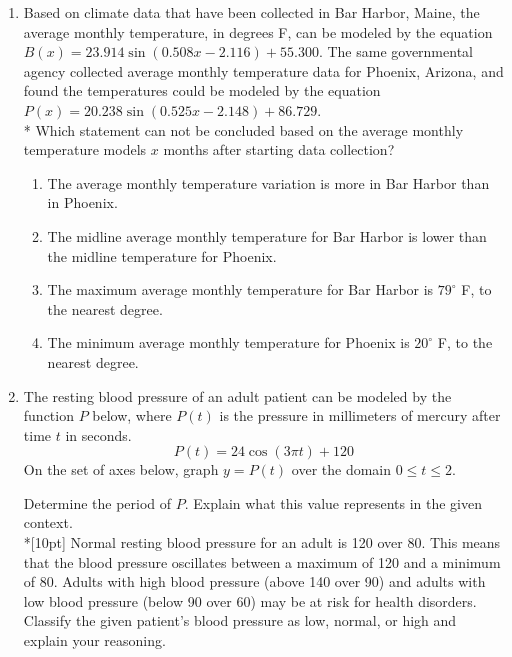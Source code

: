 \documentclass[12pt, oneside]{article}
\begin{document}
\begin{enumerate}
\item Based on climate data that have been collected in Bar Harbor, Maine, the average monthly temperature, in degrees F, can be modeled by the equation $B(x)=23.914 \sin(0.508x-2.116)+55.300$. The same governmental agency collected average monthly temperature data for Phoenix, Arizona, and found the temperatures could be modeled by the equation $P(x)=20.238 \sin(0.525x-2.148)+86.729$.\\*
Which statement can not be concluded based on the average monthly temperature models $x$ months after starting data collection?
\begin{enumerate}
    \item The average monthly temperature variation is more in Bar Harbor than in Phoenix.
    \item The midline average monthly temperature for Bar Harbor is lower than the midline temperature for Phoenix.
    \item The maximum average monthly temperature for Bar Harbor is $79^{\circ}$ F, to the nearest degree.
    \item The minimum average monthly temperature for Phoenix is $20^{\circ}$ F, to the nearest degree.
\end{enumerate} %

\item The resting blood pressure of an adult patient can be modeled by the function $P$ below, where $P(t)$ is the pressure in millimeters of mercury after time $t$ in seconds.
\[P(t) = 24\cos (3 \pi t) + 120\]
On the set of axes below, graph $y = P(t)$ over the domain $0 \leq t \leq 2$.
\begin{center}
\end{center}
Determine the period of $P$. Explain what this value represents in the given context.\\*[10pt]
Normal resting blood pressure for an adult is 120 over 80. This means that the blood pressure oscillates between a maximum of 120 and a minimum of 80. Adults with high blood pressure (above 140 over 90) and adults with low blood pressure (below 90 over 60) may be at risk for health disorders. Classify the given patient’s blood pressure as low, normal, or high and explain your reasoning.




\end{enumerate}
\end{document}
